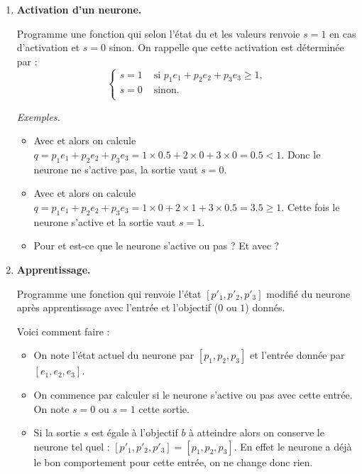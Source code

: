 \documentclass[11pt,class=report,crop=false]{standalone}
\begin{document}
\bigskip



\begin{activite}[Neurone]
	
	

\begin{enumerate}
	\item \textbf{Activation d'un neurone.}
	
	Programme une fonction 
	qui selon l'état du  et les valeurs 
	 renvoie $s=1$ en cas d'activation et $s=0$ sinon.
	On rappelle que cette activation est déterminée par :
	$$\left\{ 
	\begin{array}{rl}
	s=1  & \text{ si } p_1 e_1 + p_2e_2+p_3e_3 \ge 1, \\ 	
	s=0 & \text{ sinon.}\\
	\end{array}
	\right.$$ 
	
	\emph{Exemples.}
	\begin{itemize}
		\item Avec  et  alors
		on calcule $q = p_1 e_1 + p_2e_2+p_3e_3 = 1\times 0.5+2 \times 0 + 3\times 0 = 0.5 < 1$.
		Donc le neurone ne s'active pas, la sortie vaut $s=0$.
		
		\item Avec  et  alors
on calcule $q = p_1 e_1 + p_2e_2+p_3e_3 = 1\times 0 +2 \times 1 + 3\times 0.5 = 3.5 \ge 1$.
Cette fois le neurone s'active et la sortie vaut $s=1$.

		\item Pour  et  est-ce que le neurone s'active ou pas ? Et avec  ?
	\end{itemize}
	
	\item \textbf{Apprentissage.}
	
	Programme une fonction  qui renvoie l'état $[p'_1,p'_2,p'_3]$ modifié du neurone
	après apprentissage avec l'entrée et l'objectif ($0$ ou $1$) donnés.
	
	Voici comment faire :
	\begin{itemize}
		\item On note l'état actuel du neurone par $[p_1,p_2,p_3]$ et l'entrée donnée par $[e_1,e_2,e_3]$.
		\item On commence par calculer si le neurone s'active ou pas avec cette entrée. On note $s=0$ ou $s=1$ cette sortie.
		\item Si la sortie $s$ est égale à l'objectif $b$ à atteindre alors on conserve le neurone tel quel : 
		$[p'_1,p'_2,p'_3] = [p_1,p_2,p_3]$. En effet le neurone a déjà le bon comportement pour cette entrée, on ne change donc rien.
		

\end{itemize}
\end{enumerate}
\end{activite}
\end{document}
